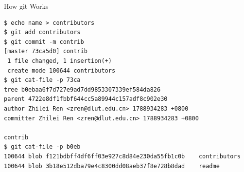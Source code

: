 \documentclass{beamer}
\begin{document}
\begin{frame}[t,fragile]{How git Works}

    \tiny
\begin{verbatim}
$ echo name > contributors
$ git add contributors
$ git commit -m contrib
[master 73ca5d0] contrib
 1 file changed, 1 insertion(+)
 create mode 100644 contributors
$ git cat-file -p 73ca
tree b0ebaa6f7d727e9ad7dd9853307339ef584da826
parent 4722e8df1fbbf644cc5a89944c157adf8c902e30
author Zhilei Ren <zren@dlut.edu.cn> 1788934283 +0800
committer Zhilei Ren <zren@dlut.edu.cn> 1788934283 +0800

contrib
$ git cat-file -p b0eb
100644 blob f121bdbff4df6ff03e927c8d84e230da55fb1c0b    contributors
100644 blob 3b18e512dba79e4c8300dd08aeb37f8e728b8dad    readme

\end{verbatim}
\end{frame}


\end{document}
